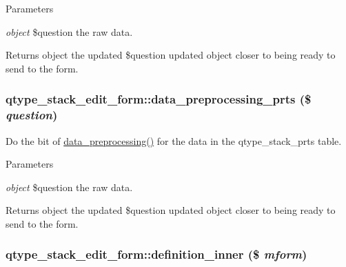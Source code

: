 \begin{DoxyParams}{Parameters}
\item[{\em object}]\$question the raw data. \end{DoxyParams}
\begin{DoxyReturn}{Returns}
object the updated \$question updated object closer to being ready to send to the form. 
\end{DoxyReturn}
\hypertarget{classqtype__stack__edit__form_af86fe81af07fff490d9c1f1d96dfc56c}{
\subsubsection[{data\_\-preprocessing\_\-prts}]{\setlength{\rightskip}{0pt plus 5cm}qtype\_\-stack\_\-edit\_\-form::data\_\-preprocessing\_\-prts (\$ {\em question})}}
\label{classqtype__stack__edit__form_af86fe81af07fff490d9c1f1d96dfc56c}
Do the bit of \hyperlink{classqtype__stack__edit__form_a3a6f3817b03966c85e356ac8ca5cf282}{data\_\-preprocessing()} for the data in the qtype\_\-stack\_\-prts table. 
\begin{DoxyParams}{Parameters}
\item[{\em object}]\$question the raw data. \end{DoxyParams}
\begin{DoxyReturn}{Returns}
object the updated \$question updated object closer to being ready to send to the form. 
\end{DoxyReturn}
\hypertarget{classqtype__stack__edit__form_a7b5500d4881577b2207e954c3fe5f249}{
\subsubsection[{definition\_\-inner}]{\setlength{\rightskip}{0pt plus 5cm}qtype\_\-stack\_\-edit\_\-form::definition\_\-inner (\$ {\em mform})}}
\label{classqtype__stack__edit__form_a7b5500d4881577b2207e954c3fe5f249}
